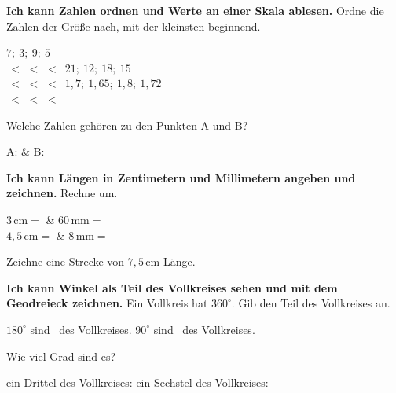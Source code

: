 \begin{aufgabe}{\textbf{Ich kann Zahlen ordnen und Werte an einer Skala ablesen.} Ordne die Zahlen der Größe nach, mit der kleinsten beginnend.}
\begin{teile}
\teil $7;\ 3;\ 9;\ 5$\\ \leerfeld\,$<$\,\leerfeld\,$<$\,\leerfeld\,$<$\,\leerfeld
\teil $21;\ 12;\ 18;\ 15$\\ \leerfeld\,$<$\,\leerfeld\,$<$\,\leerfeld\,$<$\,\leerfeld
\teil $1{,}7;\ 1{,}65;\ 1{,}8;\ 1{,}72$\\ \leerfeld\,$<$\,\leerfeld\,$<$\,\leerfeld\,$<$\,\leerfeld
\end{teile}
Welche Zahlen gehören zu den Punkten A und B?


\begin{teilezwei}
\tz A: \leerfeld & \tz B: \leerfeld \\
\end{teilezwei}
\end{aufgabe}

\begin{aufgabe}{\textbf{Ich kann Längen in Zentimetern und Millimetern angeben und zeichnen.} Rechne um.}
\begin{teilezwei}
\tz $3\,\text{cm} =$ \leerfeld[mm] & \tz $60\,\text{mm} =$ \leerfeld[cm] \\
\tz $4{,}5\,\text{cm} =$ \leerfeld[mm] & \tz $8\,\text{mm} =$ \leerfeld[cm] \\
\end{teilezwei}
\begin{teile}
\teil Zeichne eine Strecke von $7{,}5\,\text{cm}$ Länge.\par\vspace{1.2cm}
\end{teile}
\end{aufgabe}

\begin{aufgabe}{\textbf{Ich kann Winkel als Teil des Vollkreises sehen und mit dem Geodreieck zeichnen.} Ein Vollkreis hat $360^\circ$. Gib den Teil des Vollkreises an.}
\begin{teile}
\teil $180^\circ$ sind \leerfeld\ des Vollkreises.
\teil $90^\circ$ sind \leerfeld\ des Vollkreises.
\end{teile}
Wie viel Grad sind es?
\begin{teile}
\teil ein Drittel des Vollkreises: \leerfeld[$^\circ$]
\teil ein Sechstel des Vollkreises: \leerfeld[$^\circ$]
\end{teile}
\end{aufgabe}

